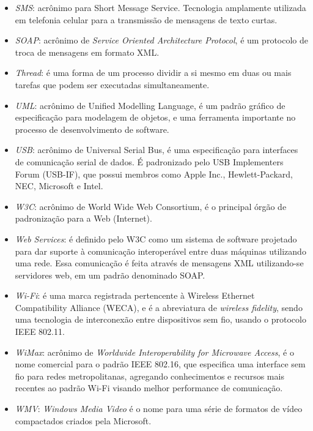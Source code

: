 \begin{itemize}
  \item \emph{SMS}: acrônimo para {S}hort {M}essage {S}ervice. Tecnologia amplamente utilizada em telefonia celular para a transmissão de mensagens de texto curtas.

  \item \emph{SOAP}: acrônimo de \emph{Service Oriented Architecture Protocol}, é um protocolo de troca de mensagens em formato XML.

  \item \emph{Thread}: é uma forma de um processo dividir a si mesmo em duas ou mais tarefas que podem ser executadas simultaneamente.

  \item \emph{UML}: acrônimo de Unified Modelling Language, é um padrão gráfico de especificação para modelagem de objetos, e uma ferramenta importante no processo de desenvolvimento de software.

  \item \emph{{USB}}: acrônimo de {U}niversal {S}erial {B}us, é uma especificação para interfaces de comunicação serial de dados. É padronizado pelo {USB} {I}mplementers {F}orum ({USB-IF}), que possui membros como Apple Inc., Hewlett-Packard, NEC, Microsoft e Intel.

  \item \emph{W3C}: acrônimo de World Wide Web Consortium, é o principal órgão de padronização para a Web (Internet).

  \item \emph{Web Services}: é definido pelo W3C como um sistema de software projetado para dar suporte à comunicação interoperável entre duas máquinas utilizando uma rede. Essa comunicação é feita através de mensagens XML utilizando-se servidores web, em um padrão denominado SOAP.

  \item \emph{Wi-Fi}: é uma marca registrada pertencente à Wireless Ethernet Compatibility Alliance (WECA), e é a abreviatura de \emph{wireless fidelity}, sendo uma tecnologia de interconexão entre dispositivos sem fio, usando o protocolo IEEE 802.11.

  \item \emph{WiMax}: acrônimo de \emph{Worldwide Interoperability for Microwave Access}, é o nome comercial para o padrão IEEE 802.16, que especifica uma interface sem fio para redes metropolitanas, agregando conhecimentos e recursos mais recentes ao padrão Wi-Fi visando melhor performance de comunicação.

  \item \emph{WMV}: \emph{Windows Media Video} é o nome para uma série de formatos de vídeo compactados criados pela Microsoft.


\end{itemize}
